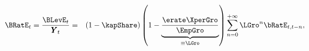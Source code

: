 \begin{eqnarray}
\BRatE_{t} = \frac{\BLevE_t}{\GDPLev_t} & = & (1-\kapShare) \left(1-\underbrace{\frac{\erate\XperGro}{\EmpGro}}_{\equiv \LGro}\right) \sum_{n=0}^{+\infty}\LGro^{n} \bRatE_{t,t-n}, \label{eq:LGro} \label{eq:BRatEIndAgg}
\end{eqnarray}
